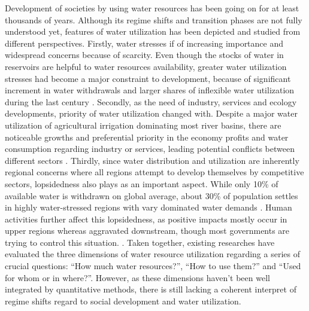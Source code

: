 \documentclass[9pt, twocolumn, twoside, lineno]{pnas-new}
\begin{document}
Development of societies by using water resources has been going on for at least thousands of years. Although its regime shifts and transition phases are not fully understood yet, features of water utilization has been depicted and studied from different perspectives.
Firstly, water stresses if of increasing importance and widespread concerns because of scarcity.
Even though the stocks of water in reservoirs are helpful to water resources availability, greater water utilization stresses had become a major constraint to development, because of significant increment in water withdrawals and larger shares of inflexible water utilization during the last century
\cite{postelHumanAppropriationRenewable1996, greveGlobalAssessmentWater2018a, qinFlexibilityIntensityGlobal2019}.
Secondly, as the need of industry, services and ecology developments, priority of water utilization changed with. 
Despite a major water utilization of agricultural irrigation dominating most river basins, there are noticeable growths and preferential priority in the economy profits and water consumption regarding industry or services, leading potential conflicts between different sectors
\cite{liuWaterScarcityAssessments2017, florkeWaterCompetitionCities2018}.
Thirdly, since water distribution and utilization are inherently regional concerns where all regions attempt to develop themselves by competitive sectors, lopsidedness also plays as an important aspect.
While only 10\% of available water is withdrawn on global average, about 30\% of population settles in highly water-stressed regions with vary dominated water demands
\cite{wadaWedgeApproachWater2014, okiGlobalHydrologicalCycles2006}.
Human activities further affect this lopsidedness, as positive impacts mostly occur in upper regions whereas aggravated downstream, though most governments are trying to control this situation. 
\cite{veldkampWaterScarcityHotspots2017}. 
Taken together, existing researches have evaluated the three dimensions of water resource utilization regarding a series of crucial questions: “How much water resources?”, “How to use them?” and “Used for whom or in where?”.
However, as these dimensions haven't been well integrated by quantitative methods, there is still lacking a coherent interpret of regime shifts regard to social development and water utilization.
\end{document}
